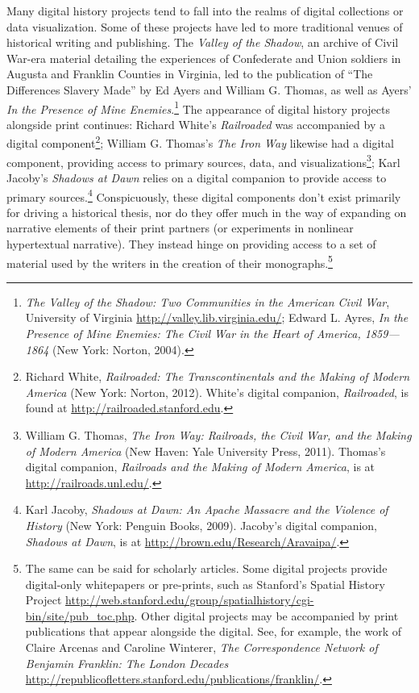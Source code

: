 \documentclass[11pt,]{article}
\begin{document}
Many digital history projects tend to fall into the realms of digital
collections or data visualization. Some of these projects have led to
more traditional venues of historical writing and publishing. The
\emph{Valley of the Shadow}, an archive of Civil War-era material
detailing the experiences of Confederate and Union soldiers in Augusta
and Franklin Counties in Virginia, led to the publication of ``The
Differences Slavery Made'' by Ed Ayers and William G. Thomas, as well as
Ayers' \emph{In the Presence of Mine Enemies}.\footnote{\emph{The Valley
  of the Shadow: Two Communities in the American Civil War}, University
  of Virginia \url{http://valley.lib.virginia.edu/}; Edward L. Ayres,
  \emph{In the Presence of Mine Enemies: The Civil War in the Heart of
  America, 1859---1864} (New York: Norton, 2004).} The appearance of
digital history projects alongside print continues: Richard White's
\emph{Railroaded} was accompanied by a digital component\footnote{Richard
  White, \emph{Railroaded: The Transcontinentals and the Making of
  Modern America} (New York: Norton, 2012). White's digital companion,
  \emph{Railroaded}, is found at \url{http://railroaded.stanford.edu}.};
William G. Thomas's \emph{The Iron Way} likewise had a digital
component, providing access to primary sources, data, and
visualizations\footnote{William G. Thomas, \emph{The Iron Way:
  Railroads, the Civil War, and the Making of Modern America} (New
  Haven: Yale University Press, 2011). Thomas's digital companion,
  \emph{Railroads and the Making of Modern America}, is at
  \url{http://railroads.unl.edu/}.}; Karl Jacoby's \emph{Shadows at
Dawn} relies on a digital companion to provide access to primary
sources.\footnote{Karl Jacoby, \emph{Shadows at Dawn: An Apache Massacre
  and the Violence of History} (New York: Penguin Books, 2009). Jacoby's
  digital companion, \emph{Shadows at Dawn}, is at
  \url{http://brown.edu/Research/Aravaipa/}.} Conspicuously, these
digital components don't exist primarily for driving a historical
thesis, nor do they offer much in the way of expanding on narrative
elements of their print partners (or experiments in nonlinear
hypertextual narrative). They instead hinge on providing access to a set
of material used by the writers in the creation of their
monographs.\footnote{The same can be said for scholarly articles. Some
  digital projects provide digital-only whitepapers or pre-prints, such
  as Stanford's Spatial History Project
  \url{http://web.stanford.edu/group/spatialhistory/cgi-bin/site/pub_toc.php}.
  Other digital projects may be accompanied by print publications that
  appear alongside the digital. See, for example, the work of Claire
  Arcenas and Caroline Winterer, \emph{The Correspondence Network of
  Benjamin Franklin: The London Decades}
  \url{http://republicofletters.stanford.edu/publications/franklin/}.}
\end{document}
